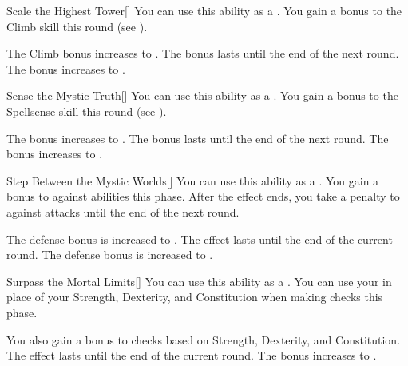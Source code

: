 {            \begin{freeability}{Scale the Highest Tower}[]
                You can use this ability as a .
                You gain a  bonus to the Climb skill this round (see ).

                \rankline
                 The Climb bonus increases to .
                 The bonus lasts until the end of the next round.
                 The bonus increases to .
            \end{freeability}

            \begin{freeability}{Sense the Mystic Truth}[]
                You can use this ability as a .
                You gain a  bonus to the Spellsense skill this round (see ).

                \rankline
                 The bonus increases to .
                 The bonus lasts until the end of the next round.
                 The bonus increases to .
            \end{freeability}

            \begin{freeability}{Step Between the Mystic Worlds}[]
                You can use this ability as a .
                You gain a  bonus to  against  abilities this phase.
                After the effect ends, you take a  penalty to  against  attacks until the end of the next round.

                \rankline
                 The defense bonus is increased to .
                 The effect lasts until the end of the current round.
                 The defense bonus is increased to .
            \end{freeability}

            \begin{freeability}{Surpass the Mortal Limits}[]
                You can use this ability as a .
                You can use your  in place of your Strength, Dexterity, and Constitution when making checks this phase.

                \rankline
                 You also gain a  bonus to checks based on Strength, Dexterity, and Constitution.
                 The effect lasts until the end of the current round.
                 The bonus increases to .
            \end{freeability}

        }

